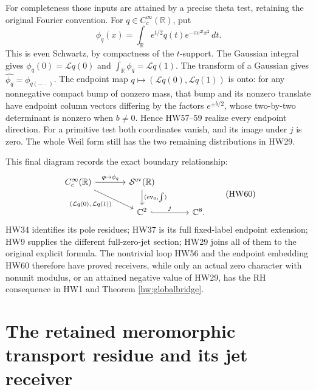 \documentclass[11pt]{article}
\newcommand{\C}{\mathbb C}
\newcommand{\R}{\mathbb R}
\begin{document}
For completeness those inputs are attained by a precise
theta test, retaining the original Fourier convention.
For \(q\in C_c^\infty(\R)\), put
\[
 \phi_q(x)=\int_\R e^{t/2}q(t)e^{-\pi e^{2t}x^2}\,dt .
 \tag{HW59}
\]
This is even Schwartz, by compactness of the \(t\)-support.
The Gaussian integral gives
\(\phi_q(0)=\mathcal Lq(0)\) and
\(\int_\R\phi_q=\mathcal Lq(1)\).
The transform of a Gaussian gives
\(\widehat{\phi_q}=\phi_{q(-\,\cdot\,)}\).
The endpoint map \(q\mapsto(\mathcal Lq(0),\mathcal Lq(1))\)
is onto: for any nonnegative compact bump of nonzero mass,
that bump and its nonzero translate have endpoint column
vectors differing by the factors \(e^{\pm b/2}\), whose
two-by-two determinant is nonzero when \(b\ne0\).
Hence HW57--59 realize every endpoint direction.
For a primitive test both coordinates vanish, and its
image under \(j\) is zero. The whole Weil form still has
the two remaining distributions in HW29.

This final diagram records the exact boundary relationship:
\[
 \begin{tikzcd}[column sep=large]
 C_c^\infty(\R) \arrow[r,"q\mapsto\phi_q"]
          \arrow[dr,"{(\mathcal Lq(0),\,\mathcal Lq(1))}"']
  &\mathcal S^{\rm ev}(\R)\arrow[d,"{(\mathrm{ev}_0,\int)}"]\\
  &\C^2\arrow[r,hook,"j"]&\C^8 .
 \end{tikzcd}
 \tag{HW60}
\]
HW34 identifies its pole residues; HW37 is its full
fixed-label endpoint extension; HW9 supplies the different
full-zero-jet section; HW29 joins all of them to the
original explicit formula. The nontrivial loop HW56 and
the endpoint embedding HW60 therefore have proved
receivers, while only an actual zero character with
nonunit modulus, or an attained negative value of HW29,
has the RH consequence in HW1 and Theorem
\ref{hw:globalbridge}.

\section{The retained meromorphic transport residue and its jet receiver}
\end{document}
